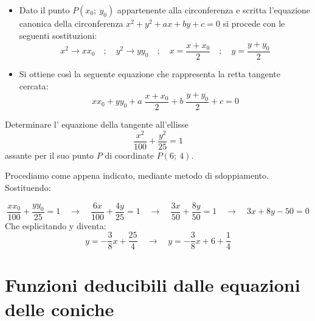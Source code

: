 \begin{itemize} [noitemsep]
  \item  Dato il punto \(P( x_{0};~ y_{0} )\) appartenente alla 
circonferenza e scritta l'equazione canonica della circonferenza \( x^{2} + 
y^{2} +ax+by+c=0\) si procede con le seguenti sostituzioni:
\[ x^{2} \longrightarrow x x_{0}  \quad ;\quad y^{2} \longrightarrow y y_{0}\quad ;\quad
x= \dfrac{x+x_{0}}{2} \quad ;\quad y= \dfrac{y+y_{0}}{2}\]

  \item Si ottiene così la seguente equazione che rappresenta la retta 
tangente cercata:
 \[x x_{0} +y y_{0}+a\; \dfrac{x+x_{0}}{2}  +b\; \dfrac{y+y_{0}}{2} +c=0\]
\end{itemize}

\begin{minipage}{.40\textwidth}
\begin{esempio} Determinare l' equazione della tangente 
all'ellisse 
\[\dfrac{x^{2}}{100}+\dfrac{y^{2}}{25} =1\]
assante per il suo punto \(P\) di coordinate \(P\left(6;~4\right)\).

\noindent
Procediamo come appena indicato, mediante metodo di sdoppiamento. 
Sostituendo:
\end{esempio}
\end{minipage}
\hfill
\begin{minipage}{.58\textwidth}
\begin{center} \luoghitangente \end{center}
\end{minipage}
\[\dfrac{xx_{0}}{100} + \dfrac{yy_{0}}{25} = 1 \quad \rightarrow \quad
\dfrac{6x}{100} + \dfrac{4y}{25} =1 \quad \rightarrow \quad 
\dfrac{3x}{50}+\dfrac{8y}{50}=1\quad \rightarrow \quad 3x+8y-50=0\]
Che esplicitando y diventa:
\[y=-\frac{3}{8}x+\frac{25}{4} \quad \rightarrow \quad 
y=-\frac{3}{8}x+6+\frac{1}{4}\]

\section{Funzioni deducibili dalle equazioni delle coniche}
\label{sec:coniche_curve_deducibili}

